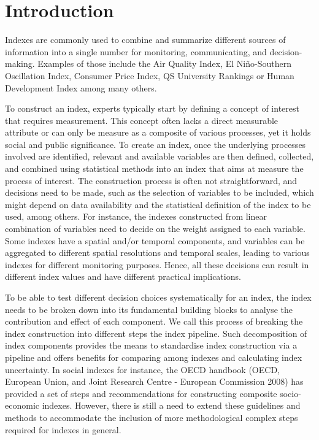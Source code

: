 \documentclass[
]{interact}
\begin{document}
\hypertarget{introduction}{%
\section{Introduction}\label{introduction}}

Indexes are commonly used to combine and summarize different sources of
information into a single number for monitoring, communicating, and
decision-making. Examples of those include the Air Quality Index, El
Niño-Southern Oscillation Index, Consumer Price Index, QS University
Rankings or Human Development Index among many others.

To construct an index, experts typically start by defining a concept of
interest that requires measurement. This concept often lacks a direct
measurable attribute or can only be measure as a composite of various
processes, yet it holds social and public significance. To create an
index, once the underlying processes involved are identified, relevant
and available variables are then defined, collected, and combined using
statistical methods into an index that aims at measure the process of
interest. The construction process is often not straightforward, and
decisions need to be made, such as the selection of variables to be
included, which might depend on data availability and the statistical
definition of the index to be used, among others. For instance, the
indexes constructed from linear combination of variables need to decide
on the weight assigned to each variable. Some indexes have a spatial
and/or temporal components, and variables can be aggregated to different
spatial resolutions and temporal scales, leading to various indexes for
different monitoring purposes. Hence, all these decisions can result in
different index values and have different practical implications.

To be able to test different decision choices systematically for an
index, the index needs to be broken down into its fundamental building
blocks to analyse the contribution and effect of each component. We call
this process of breaking the index construction into different steps the
index pipeline. Such decomposition of index components provides the
means to standardise index construction via a pipeline and offers
benefits for comparing among indexes and calculating index uncertainty.
In social indexes for instance, the OECD handbook (OECD, European Union,
and Joint Research Centre - European Commission 2008) has provided a set
of steps and recommendations for constructing composite socio-economic
indexes. However, there is still a need to extend these guidelines and
methods to accommodate the inclusion of more methodological complex
steps required for indexes in general.
\end{document}
